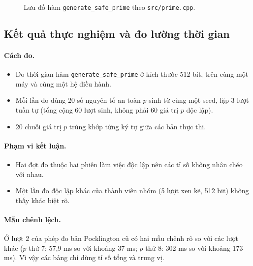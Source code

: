 \begin{figure}[h!]
{%
}
\caption{Lưu đồ hàm \texttt{generate\_safe\_prime} theo \texttt{src/prime.cpp}.}
\label{fig:flow-safe-prime}
\end{figure}

\subsection{Kết quả thực nghiệm và đo lường thời gian}

\paragraph{Cách đo.}
\begin{itemize}
  \item Đo thời gian hàm \texttt{generate\_\allowbreak{}safe\_\allowbreak{}prime} ở kích thước 512 bit, trên cùng một máy và cùng một hệ điều hành.
  \item Mỗi lần đo dùng 20 số nguyên tố an toàn $p$ sinh từ cùng một seed, lặp 3 lượt tuần tự (tổng cộng 60 lượt sinh, không phải 60 giá trị $p$ độc lập).
  \item 20 chuỗi giá trị $p$ trùng khớp từng ký tự giữa các bản thực thi.
\end{itemize}

\paragraph{Phạm vi kết luận.}
\begin{itemize}
  \item Hai đợt đo thuộc hai phiên làm việc độc lập nên các tỉ số không nhân chéo với nhau.
  \item Một lần đo độc lập khác của thành viên nhóm (5 lượt xen kẽ, 512 bit) không thấy khác biệt rõ.
\end{itemize}

\paragraph{Mẫu chênh lệch.}
Ở lượt 2 của phép đo bản Pocklington cũ có hai mẫu chênh rõ so với các lượt khác ($p$ thứ 7: 57,9 ms so với khoảng 37 ms; $p$ thứ 8: 302 ms so với khoảng 173 ms). Vì vậy các bảng chỉ dùng tỉ số tổng và trung vị.

